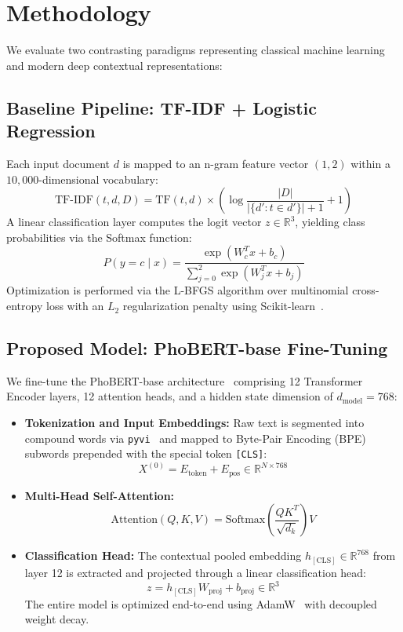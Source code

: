 \documentclass[conference]{IEEEtran}
\begin{document}
\section{Methodology}
We evaluate two contrasting paradigms representing classical machine learning and modern deep contextual representations:

\subsection{Baseline Pipeline: TF-IDF + Logistic Regression}
Each input document $d$ is mapped to an n-gram feature vector $(1, 2)$ within a $10,000$-dimensional vocabulary:
\begin{equation}
\text{TF-IDF}(t, d, D) = \text{TF}(t, d) \times \left( \log \frac{|D|}{|\{d': t \in d'\}| + 1} + 1 \right)
\end{equation}
A linear classification layer computes the logit vector $z \in \mathbb{R}^3$, yielding class probabilities via the Softmax function:
\begin{equation}
P(y = c \mid x) = \frac{\exp(W_c^T x + b_c)}{\sum_{j=0}^2 \exp(W_j^T x + b_j)}
\end{equation}
Optimization is performed via the L-BFGS algorithm over multinomial cross-entropy loss with an $L_2$ regularization penalty using Scikit-learn~\cite{pedregosa2011scikit}.

\subsection{Proposed Model: PhoBERT-base Fine-Tuning}
We fine-tune the PhoBERT-base architecture~\cite{phobert2020,wolf2020transformers} comprising 12 Transformer Encoder layers, 12 attention heads, and a hidden state dimension of $d_{\text{model}} = 768$:
\begin{itemize}
    \item \textbf{Tokenization and Input Embeddings:} Raw text is segmented into compound words via \texttt{pyvi}~\cite{pyvi2016} and mapped to Byte-Pair Encoding (BPE) subwords prepended with the special token \texttt{[CLS]}:
    \begin{equation}
    X^{(0)} = E_{\text{token}} + E_{\text{pos}} \in \mathbb{R}^{N \times 768}
    \end{equation}
    \item \textbf{Multi-Head Self-Attention:}
    \begin{equation}
    \text{Attention}(Q, K, V) = \text{Softmax}\left(\frac{QK^T}{\sqrt{d_k}}\right)V
    \end{equation}
    \item \textbf{Classification Head:} The contextual pooled embedding $h_{[\text{CLS}]} \in \mathbb{R}^{768}$ from layer 12 is extracted and projected through a linear classification head:
    \begin{equation}
    z = h_{[\text{CLS}]} W_{\text{proj}} + b_{\text{proj}} \in \mathbb{R}^3
    \end{equation}
    The entire model is optimized end-to-end using AdamW~\cite{loshchilov2018decoupled} with decoupled weight decay.
\end{itemize}
\end{document}
